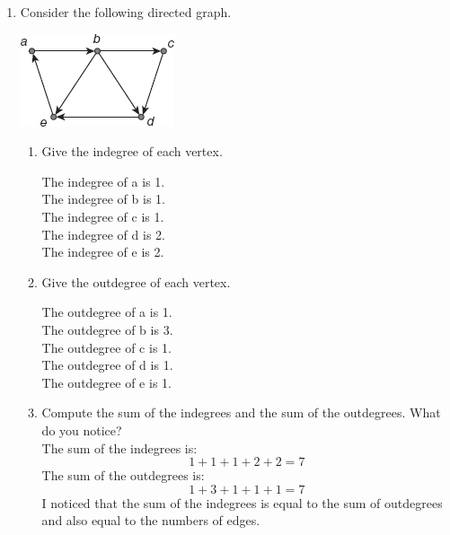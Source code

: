 \documentclass[12pt]{article}
\begin{document}
\begin{enumerate}
  \item Consider the following directed graph.
        \begin{center}
          \includegraphics{img/img-1.png}
        \end{center}
        \begin{enumerate}
        \newpage
          \item Give the indegree of each vertex.\\
            \begin{center}
              The indegree of a is 1.\\
              The indegree of b is 1.\\
              The indegree of c is 1.\\
              The indegree of d is 2.\\
              The indegree of e is 2.
            \end{center}

          \item Give the outdegree of each vertex.\\
            \begin{center}
              The outdegree of a is 1.\\
              The outdegree of b is 3.\\
              The outdegree of c is 1.\\
              The outdegree of d is 1.\\
              The outdegree of e is 1.
            \end{center}

            \item Compute the sum of the indegrees and the sum of the outdegrees. What do you notice?\\
            The sum of the indegrees is:
            \[1 + 1 + 1 + 2 + 2 = 7\]
            The sum of the outdegrees is:
            \[1+3+1+1+1 = 7\]
            I noticed that the sum of the indegrees is equal to the sum of outdegrees and also equal to the numbers of edges.
            
        \end{enumerate}


\end{enumerate}
\end{document}
